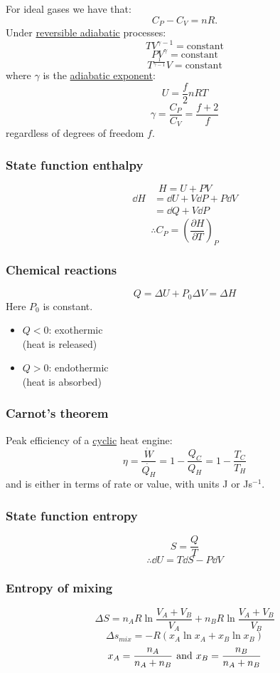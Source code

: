 \documentclass{article}
\begin{document}
\begin{multicols*}{3}
For ideal gases we have that:
$$C_P-C_V=nR.$$
Under \underline{reversible adiabatic} processes:
$$TV^{\gamma-1}=\text{constant}$$
$$PV^{\gamma}=\text{constant}$$
$$T^{\frac{1}{\gamma-1}}V=\text{constant}$$
where $\gamma$ is the \underline{adiabatic exponent}:
$$U=\frac{f}{2}nRT$$
$$\gamma=\frac{C_P}{C_V}
=\frac{f+2}{f}$$
regardless of degrees of freedom $f$.

\subsubsection*{State function enthalpy}
$$H=U+PV$$
\begin{align*}
    \dd H
    &=\dd U+V\dd P+P\dd V \\
    &=\dd Q+V\dd P
\end{align*}
$$\therefore C_P
=\left(\frac{\partial H}{\partial T}\right)_P$$

\subsubsection*{Chemical reactions}
$$Q=\Delta U+P_0\Delta V=\Delta H$$
Here $P_0$ is constant.
\begin{itemize}
    \item $Q<0$: exothermic \\
    (heat is released)
    \item $Q>0$: endothermic \\
    (heat is absorbed)
\end{itemize}

\subsubsection*{Carnot's theorem}
Peak efficiency of a \underline{cyclic}
heat engine:
$$\eta=\frac{\dot{W}}{\dot{Q_H}}=1-\frac{Q_C}{Q_H}
=1-\frac{T_C}{T_H}$$
and is either in terms of rate or value, 
with units J or Js$^{-1}$.

\subsubsection*{State function entropy}
$$S=\frac{Q}{T}$$
$$\therefore\dd U=T\dd S-P\dd V$$

\subsubsection*{Entropy of mixing}
$$\Delta S=n_A R\ln\frac{V_A+V_B}{V_A}
+n_B R\ln\frac{V_A+V_B}{V_B}$$
$$\Delta s_{mix}=-R(x_A\ln x_A+x_B\ln x_B)$$
$$x_A=\frac{n_A}{n_A+n_B}
\hspace{0.05in}\text{and}\hspace{0.05in}
x_B=\frac{n_B}{n_A+n_B}$$


\end{multicols*}
\end{document}
